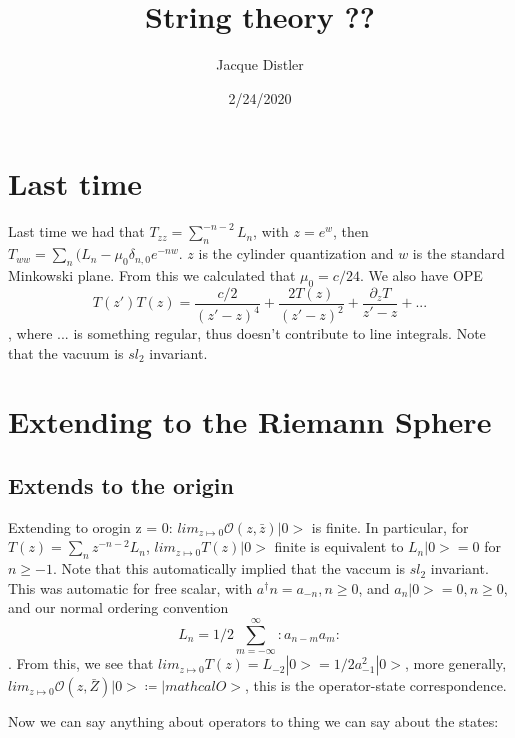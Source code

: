 \documentclass[12pt]{article}%
\title{String theory ??} %
\author{Jacque Distler} %
\date{2/24/2020} %
\theoremstyle{definition}
\theoremstyle{remark}
\theoremstyle{definition}
\theoremstyle{definition}
\begin{document}
    \maketitle %

    \noindent %

    \tableofcontents %

    \section{Last time}

    Last time we had that $T_{zz} = \sum_n ^{-n-2} L_n$, with $z = e^w$, then $T_{ww} = \sum_n (L_n - \mu_0 \delta_{n,0}e^{-nw}$. $z$ is the cylinder quantization and $w$ is the standard Minkowski plane. From this we calculated that $\mu_0 = c/24$. We also have OPE
    $$ T(z') T(z) = \frac{c/2}{(z'-z)^4} + \frac{2T(z)}{(z'-z)^2} + \frac{\partial_z T}{z' -z} + ...$$, where $...$ is something regular, thus doesn't contribute to line integrals.
    Note that the vacuum is $sl_2$ invariant.

    \section{Extending to the Riemann Sphere}

    \subsection{Extends to the origin}

    Extending to orogin z = 0: $lim_{z \mapsto 0} \mathcal{O}(z,\bar{z}) |0>$ is finite. In particular, for $T(z) = \sum_n z^{-n-2} L_n$, $lim_{z \mapsto 0} T(z) |0>$ finite is equivalent to $L_n |0> = 0$ for $n \geq -1$. Note that this automatically implied that the vaccum is $sl_2$ invariant.
    This was automatic for free scalar, with $a^\dagger n = a_{-n}, n \geq 0$, and $a_n |0> = 0, n \geq 0$,
    and our normal ordering convention $$L_n = 1/2 \sum_{m = -\infty}^\infty :a_{n-m}a_m:$$ . From this, we see that $lim_{z\mapsto 0} T(z) = L_{-2} |0> = 1/2 a^2_{-1}|0>$, more generally, $lim_{z\mapsto 0} \mathcal{O}(z,\bar{Z}) |0> \coloneqq |mathcal{O}>$, this is the operator-state correspondence.

    Now we can say anything about operators to thing we can say about the states:
\end{document}
